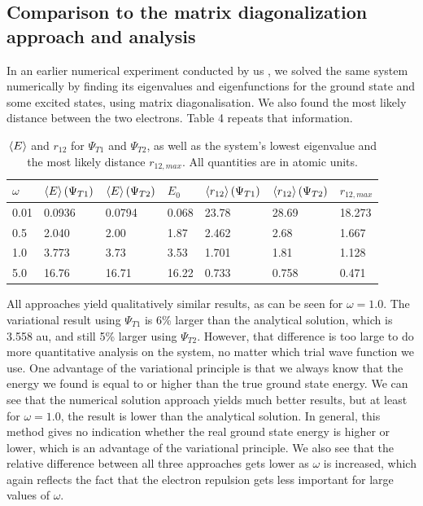 \documentclass[10pt,a4paper]{article}
\begin{document}
\subsection{Comparison to the matrix diagonalization approach and analysis}
In an earlier numerical experiment conducted by us \cite{Project2}, we solved the same system numerically by finding its eigenvalues and eigenfunctions for the ground state and some excited states, using matrix diagonalisation. We also found the most likely distance between the two electrons. Table 4 repeats that information. 
\begin{table}[H]
\centering
\caption[Energies and distances compared to diagonalisation]{$\braket{E}$ and $r_{12}$ for $\Psi_{T1}$ and $\Psi_{T2}$, as well as the system's lowest eigenvalue and the most likely distance $r_{12,max}$. All quantities are in atomic units.}
\begin{tabular}{|l|l|l|l|l|l|l|}
\hline
$\omega$ & $\braket{E}(\Psi_{T1})$ & $\braket{E}(\Psi_{T2})$ & $E_0$ & $\braket{r_{12}}(\Psi_{T1})$ & $\braket{r_{12}}(\Psi_{T2})$ & $r_{12,max}$ \\ \hline
0.01     & 0.0936                 & 0.0794                  & 0.068 & 23.78                        & 28.69                        & 18.273    \\ \hline
0.5      & 2.040                  & 2.00                    & 1.87  & 2.462                        & 2.68                         & 1.667     \\ \hline
1.0      & 3.773                  & 3.73                    & 3.53  & 1.701                        & 1.81                         & 1.128     \\ \hline
5.0      & 16.76                  & 16.71                   & 16.22 & 0.733                        & 0.758                        & 0.471     \\ \hline
\end{tabular}
\end{table}
All approaches yield qualitatively similar results, as can be seen for $\omega=1.0$. The variational result using $\Psi_{T1}$ is 6\% larger than the analytical solution, which is 3.558 au, and still 5\% larger using $\Psi_{T2}$. However, that difference is too large to do more quantitative analysis on the system, no matter which trial wave function we use.  One advantage of the variational principle is that we always know that the energy we found is equal to or higher than the true ground state energy. We can see that the numerical solution approach yields much better results, but at least for $\omega=1.0$, the result is lower than the analytical solution. In general, this method gives no indication whether the real ground state energy is higher or lower, which is an advantage of the variational principle. We also see that the relative difference between all three approaches gets lower as $\omega$ is increased, which again reflects the fact that the electron repulsion gets less important for large values of $\omega$.\\
\end{document}

